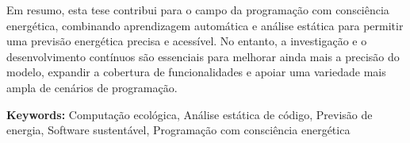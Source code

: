 Em resumo, esta tese contribui para o campo da programação com consciência energética, combinando aprendizagem automática e análise estática para permitir uma previsão energética precisa e acessível. No entanto, a investigação e o desenvolvimento contínuos são essenciais para melhorar ainda mais a precisão do modelo, expandir a cobertura de funcionalidades e apoiar uma variedade mais ampla de cenários de programação.


\vfill

\begin{flushleft}
\textbf{Keywords:}
Computação ecológica, Análise estática de código, Previsão de energia, Software sustentável, Programação com consciência energética
\end{flushleft}

{}
